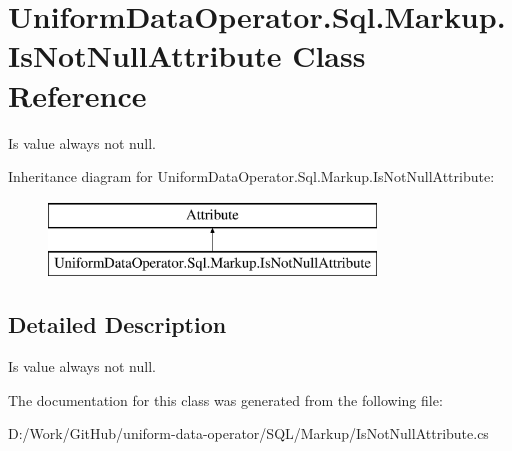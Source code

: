 \hypertarget{class_uniform_data_operator_1_1_sql_1_1_markup_1_1_is_not_null_attribute}{}\section{Uniform\+Data\+Operator.\+Sql.\+Markup.\+Is\+Not\+Null\+Attribute Class Reference}
\label{class_uniform_data_operator_1_1_sql_1_1_markup_1_1_is_not_null_attribute}


Is value always not null.  


Inheritance diagram for Uniform\+Data\+Operator.\+Sql.\+Markup.\+Is\+Not\+Null\+Attribute\+:\begin{figure}[H]
\begin{center}
\leavevmode
\includegraphics[height=2.000000cm]{d2/dbb/class_uniform_data_operator_1_1_sql_1_1_markup_1_1_is_not_null_attribute}
\end{center}
\end{figure}


\subsection{Detailed Description}
Is value always not null. 



The documentation for this class was generated from the following file\+:\begin{DoxyCompactItemize}
\item 
D\+:/\+Work/\+Git\+Hub/uniform-\/data-\/operator/\+S\+Q\+L/\+Markup/Is\+Not\+Null\+Attribute.\+cs\end{DoxyCompactItemize}
